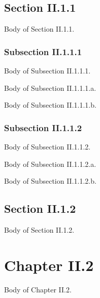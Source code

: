 \documentclass[openright,twoside,11pt]{book}
\begin{document}
\section{Section II.1.1}
Body of Section II.1.1.

\subsection{Subsection II.1.1.1}
Body of Subsection II.1.1.1.

Body of Subsection II.1.1.1.a.

Body of Subsection II.1.1.1.b.

\subsection{Subsection II.1.1.2}
Body of Subsection II.1.1.2.

Body of Subsection II.1.1.2.a.

Body of Subsection II.1.1.2.b.

\section{Section II.1.2}
Body of Section II.1.2.

\chapter{Chapter II.2}
Body of Chapter II.2.
\end{document}

